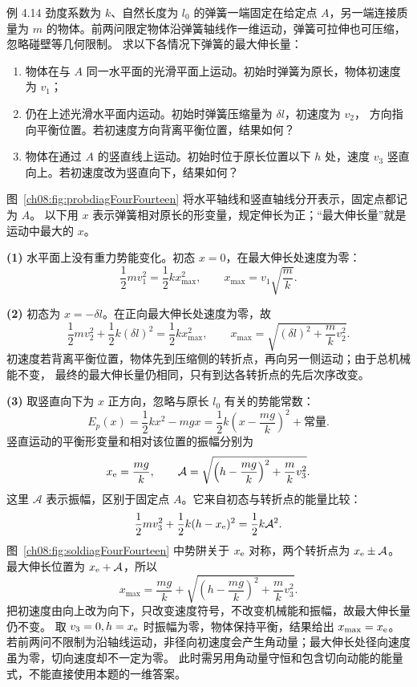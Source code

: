 \Needspace{0.32\textheight}
\begin{origexamplebox}{例 4.14}
劲度系数为 $k$、自然长度为 $l_0$ 的弹簧一端固定在给定点 $A$，另一端连接质量为
$m$ 的物体。前两问限定物体沿弹簧轴线作一维运动，弹簧可拉伸也可压缩，忽略碰壁等几何限制。
求以下各情况下弹簧的最大伸长量：
\begin{enumerate}[label=\arabic*.,leftmargin=2.2em]
 \item 物体在与 $A$ 同一水平面的光滑平面上运动。初始时弹簧为原长，物体初速度为
 $v_1$；
 \item 仍在上述光滑水平面内运动。初始时弹簧压缩量为 $\delta l$，初速度为 $v_2$，
 方向指向平衡位置。若初速度方向背离平衡位置，结果如何？
 \item 物体在通过 $A$ 的竖直线上运动。初始时位于原长位置以下 $h$ 处，速度 $v_3$
 竖直向上。若初速度改为竖直向下，结果如何？
\end{enumerate}
\probdiagFourFourteen
\end{origexamplebox}

\begin{xesolution}
图~\ref{ch08:fig:probdiagFourFourteen} 将水平轴线和竖直轴线分开表示，固定点都记为 $A$。
以下用 $x$ 表示弹簧相对原长的形变量，规定伸长为正；“最大伸长量”就是运动中最大的
$x$。

\textbf{(1)} 水平面上没有重力势能变化。初态 $x=0$，在最大伸长处速度为零：
\[
\frac12mv_1^2=\frac12kx_{\max}^2,
\qquad
\boxed{x_{\max}=v_1\sqrt{\frac{m}{k}}}.
\]

\textbf{(2)} 初态为 $x=-\delta l$。在正向最大伸长处速度为零，故
\[
\frac12mv_2^2+\frac12k(\delta l)^2
=\frac12kx_{\max}^2,
\qquad
\boxed{
 x_{\max}=\sqrt{(\delta l)^2+\frac{m}{k}v_2^2}}.
\]
初速度若背离平衡位置，物体先到压缩侧的转折点，再向另一侧运动；由于总机械能不变，
最终的最大伸长量仍相同，只有到达各转折点的先后次序改变。

\textbf{(3)} 取竖直向下为 $x$ 正方向，忽略与原长 $l_0$ 有关的势能常数：
\[
E_p(x)=\frac12kx^2-mgx
=\frac12k\left(x-\frac{mg}{k}\right)^2+\text{常量}.
\]
竖直运动的平衡形变量和相对该位置的振幅分别为
\[
x_{\rm e}=\frac{mg}{k},
\qquad
\mathcal A=\sqrt{\left(h-\frac{mg}{k}\right)^2+\frac{m}{k}v_3^2}.
\]
\soldiagFourFourteen
这里 $\mathcal A$ 表示振幅，区别于固定点 $A$。它来自初态与转折点的能量比较：
\[
 \frac12mv_3^2+\frac12k(h-x_{\rm e})^2=\frac12k\mathcal A^2.
\]
图~\ref{ch08:fig:soldiagFourFourteen} 中势阱关于 $x_{\rm e}$ 对称，两个转折点为 $x_{\rm e}\pm\mathcal A$。
最大伸长位置为 $x_{\rm e}+\mathcal A$，所以
\[
\boxed{
 x_{\max}=\frac{mg}{k}
 +\sqrt{\left(h-\frac{mg}{k}\right)^2+\frac{m}{k}v_3^2}}.
\]
把初速度由向上改为向下，只改变速度符号，不改变机械能和振幅，故最大伸长量仍不变。
取 $v_3=0,h=x_{\rm e}$ 时振幅为零，物体保持平衡，结果给出 $x_{\max}=x_{\rm e}$。
若前两问不限制为沿轴线运动，非径向初速度会产生角动量；最大伸长处径向速度虽为零，切向速度却不一定为零。
此时需另用角动量守恒和包含切向动能的能量式，不能直接使用本题的一维答案。
\end{xesolution}



